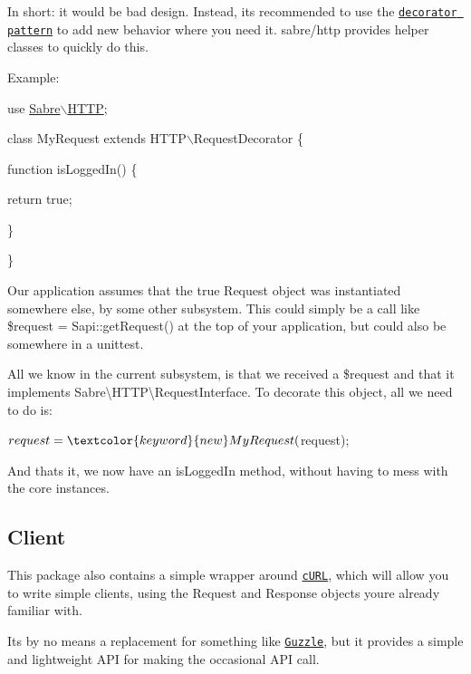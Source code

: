 In short\+: it would be bad design. Instead, it\textquotesingle{}s recommended to use the \href{http://en.wikipedia.org/wiki/Decorator_pattern}{\tt decorator pattern} to add new behavior where you need it. {\ttfamily sabre/http} provides helper classes to quickly do this.

Example\+:


\begin{DoxyCode}
use \mbox{\hyperlink{namespace_sabre_1_1_h_t_t_p}{Sabre\(\backslash\)HTTP}};

\textcolor{keyword}{class }MyRequest \textcolor{keyword}{extends} HTTP\(\backslash\)RequestDecorator \{

    \textcolor{keyword}{function} isLoggedIn() \{

        \textcolor{keywordflow}{return} \textcolor{keyword}{true};

    \}

\}
\end{DoxyCode}


Our application assumes that the true {\ttfamily Request} object was instantiated somewhere else, by some other subsystem. This could simply be a call like {\ttfamily \$request = Sapi\+::get\+Request()} at the top of your application, but could also be somewhere in a unittest.

All we know in the current subsystem, is that we received a {\ttfamily \$request} and that it implements {\ttfamily Sabre\textbackslash{}H\+T\+TP\textbackslash{}Request\+Interface}. To decorate this object, all we need to do is\+:


\begin{DoxyCode}
$request = \textcolor{keyword}{new} MyRequest($request);
\end{DoxyCode}


And that\textquotesingle{}s it, we now have an {\ttfamily is\+Logged\+In} method, without having to mess with the core instances.

\subsection*{Client }

This package also contains a simple wrapper around \href{http://php.net/curl}{\tt c\+U\+RL}, which will allow you to write simple clients, using the {\ttfamily Request} and {\ttfamily Response} objects you\textquotesingle{}re already familiar with.

It\textquotesingle{}s by no means a replacement for something like \href{http://guzzlephp.org/}{\tt Guzzle}, but it provides a simple and lightweight A\+PI for making the occasional A\+PI call.

